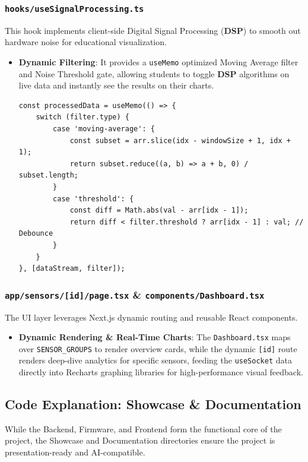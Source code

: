 \documentclass[12pt,a4paper]{article}
\newcommand{\keyword}[1]{\textcolor{keywordcolor}{\textbf{#1}}}
\newcommand{\Q}[1]{\textcolor{questioncolor}{\textbf{#1}}}
\newcommand{\codeinline}[1]{\texttt{\small #1}}
\begin{document}
\subsubsection*{\codeinline{hooks/useSignalProcessing.ts}}
This hook implements client-side Digital Signal Processing (\keyword{DSP}) to smooth out hardware noise for educational visualization.
\begin{itemize}
    \item \Q{Dynamic Filtering}:
    It provides a \texttt{useMemo} optimized Moving Average filter and Noise Threshold gate, allowing students to toggle \keyword{DSP} algorithms on live data and instantly see the results on their charts.
\begin{verbatim}
const processedData = useMemo(() => {
    switch (filter.type) {
        case 'moving-average': {
            const subset = arr.slice(idx - windowSize + 1, idx + 1);
            return subset.reduce((a, b) => a + b, 0) / subset.length;
        }
        case 'threshold': {
            const diff = Math.abs(val - arr[idx - 1]);
            return diff < filter.threshold ? arr[idx - 1] : val; // Debounce
        }
    }
}, [dataStream, filter]);
\end{verbatim}
\end{itemize}

\subsubsection*{\codeinline{app/sensors/[id]/page.tsx} \& \codeinline{components/Dashboard.tsx}}
The UI layer leverages Next.js dynamic routing and reusable React components.
\begin{itemize}
    \item \Q{Dynamic Rendering \& Real-Time Charts}:
    The \texttt{Dashboard.tsx} maps over \texttt{SENSOR\_GROUPS} to render overview cards, while the dynamic \texttt{[id]} route renders deep-dive analytics for specific sensors, feeding the \texttt{useSocket} data directly into Recharts graphing libraries for high-performance visual feedback.
\end{itemize}

\vspace{0.5cm}

\subsection*{Code Explanation: Showcase \& Documentation}

While the Backend, Firmware, and Frontend form the functional core of the project, the Showcase and Documentation directories ensure the project is presentation-ready and AI-compatible.
\end{document}
